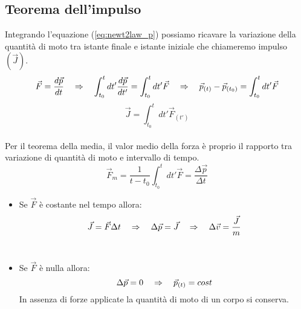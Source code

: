 \subsection{Teorema dell'impulso}
Integrando l'equazione (\ref{eq:newt2law_p}) possiamo ricavare la variazione della
quantità di moto tra istante finale e istante iniziale che chiameremo impulso $(\vec J)$.
\begin{equation}
    \vec F = \frac{d\vec p}{dt}\quad\Rightarrow\quad \int_{t_0}^tdt'\frac{d\vec p}{dt'} =
    \int_{t_0}^tdt'\vec F\quad\Rightarrow\quad \vec p_{(t)} - \vec p_{\left( t_0\right)} =
    \int_{t_0}^tdt'\vec F
\end{equation}
\begin{equation}
    \boxed{\vec J = \int_{t_0}^tdt'\vec F_{(t')}}
\label{eq:pulse_theorem}
\end{equation}
\\
Per il teorema della media, il valor medio della forza  è proprio il rapporto tra variazione di quantità di moto e intervallo di tempo.
\begin{equation}
\vec F_m = \frac1{t-t_0}\int_{t_0}^tdt'\vec F = \frac{\Delta\vec p}{\Delta t}
\end{equation}
\begin{itemize}
    \item Se $\vec F$ è costante nel tempo allora:
    \begin{equation}
        \vec J = \vec F\Delta t\quad\Rightarrow\quad\Delta\vec p = \vec J \quad\Rightarrow\quad\Delta\vec v
        = \frac{\vec J}m
    \end{equation}
    \\\item Se $\vec F$ è nulla allora:
    \begin{equation}
        \Delta\vec p = 0\quad\Rightarrow\quad\vec p_{(t)} = cost
    \end{equation}
    In assenza di forze applicate la quantità di moto di un corpo si conserva.
\end{itemize}